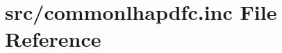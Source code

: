 \hypertarget{commonlhapdfc_8inc}{}\section{src/commonlhapdfc.inc File Reference}
\label{commonlhapdfc_8inc}
